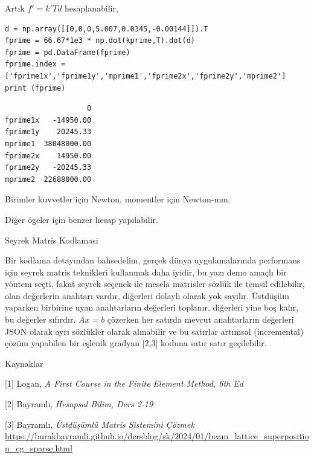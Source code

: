 \documentclass[12pt,fleqn]{article}\usepackage{../../common}
\begin{document}
Artık $f' = k' T d$ hesaplanabilir,

\begin{verbatim}
d = np.array([[0,0,0,5.007,0.0345,-0.00144]]).T
fprime = 66.67*1e3 * np.dot(kprime,T).dot(d)
fprime = pd.DataFrame(fprime)
fprime.index = ['fprime1x','fprime1y','mprime1','fprime2x','fprime2y','mprime2']
print (fprime)
\end{verbatim}

\begin{verbatim}
                   0
fprime1x   -14950.00
fprime1y    20245.33
mprime1  38048000.00
fprime2x    14950.00
fprime2y   -20245.33
mprime2  22688000.00
\end{verbatim}

Birimler kuvvetler için Newton, momentler için Newton-mm.

Diğer ögeler için benzer hesap yapılabilir.

Seyrek Matris Kodlamasi

Bir kodlama detayından bahsedelim, gerçek dünya uygulamalarında performans için
seyrek matris teknikleri kullanmak daha iyidir, bu yazı demo amaçlı bir yöntem
seçti, fakat seyrek seçenek ile mesela matrisler sözlük ile temsil edilebilir,
olan değerlerin anahtarı vardır, diğerleri dolaylı olarak yok sayılır. Üstdüşüm
yaparken birbirine uyan anahtarların değerleri toplanır, diğerleri yine boş
kalır, bu değerler sıfırdır. $Ax=b$ çözerken her satırda mevcut anahtarların
değerleri JSON olarak ayrı sözlükler olarak alınabilir ve bu satırlar artımsal
(incremental) çözüm yapabilen bir eşlenik gradyan [2,3] koduna satır satır
geçilebilir.

Kaynaklar

[1] Logan, {\em A First Course in the Finite Element Method, 6th Ed}

[2] Bayramlı, {\em Hesapsal Bilim, Ders 2-19}

[3] Bayramlı, {\em Üstdüşümlü Matris Sistemini Çözmek}
    \url{https://burakbayramli.github.io/dersblog/sk/2024/01/beam_lattice_superposition_cg_sparse.html}
\end{document}
